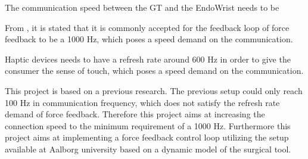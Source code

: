 The communication speed between the GT and the EndoWrist   needs to be 

{\color{green}
From \cite{coles2011role}, it is stated that it is commonly accepted for the feedback loop of force feedback to be a 1000 Hz, which poses a speed demand on the communication. 
}

{\color{red} 
Haptic devices needs to have a refresh rate around 600 Hz in order to give the consumer the sense of touch\cite{coles2011role}, which poses a speed demand on the communication.}%


This project is based on a previous research. The previous setup could only reach 100 Hz in communication frequency\cite{Chris_Surgical}, which does not satisfy the refresh rate demand of force feedback. Therefore this project aims at increasing the connection speed to the minimum
requirement of a 1000 Hz.
Furthermore this project aims at implementing a force feedback control loop utilizing the setup available at Aalborg university based on a dynamic model of the surgical tool.





